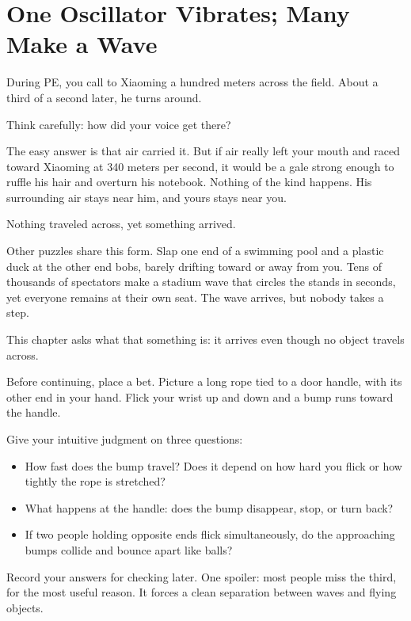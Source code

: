 \chapter{One Oscillator Vibrates; Many Make a Wave}


\begin{mainline}
During PE, you call to Xiaoming a hundred meters across the field. About a third of a second later, he turns around.

Think carefully: how did your voice get there?

The easy answer is that air carried it. But if air really left your mouth and raced toward Xiaoming at 340 meters per second, it would be a gale strong enough to ruffle his hair and overturn his notebook. Nothing of the kind happens. His surrounding air stays near him, and yours stays near you.

Nothing traveled across, yet something arrived.

Other puzzles share this form. Slap one end of a swimming pool and a plastic duck at the other end bobs, barely drifting toward or away from you. Tens of thousands of spectators make a stadium wave that circles the stands in seconds, yet everyone remains at their own seat. The wave arrives, but nobody takes a step.

This chapter asks what that something is: it arrives even though no object travels across.
\end{mainline}


\begin{mainline}
Before continuing, place a bet. Picture a long rope tied to a door handle, with its other end in your hand. Flick your wrist up and down and a bump runs toward the handle.

Give your intuitive judgment on three questions:

\begin{itemize}
  \item How fast does the bump travel? Does it depend on how hard you flick or how tightly the rope is stretched?
  \item What happens at the handle: does the bump disappear, stop, or turn back?
  \item If two people holding opposite ends flick simultaneously, do the approaching bumps collide and bounce apart like balls?
\end{itemize}

Record your answers for checking later. One spoiler: most people miss the third, for the most useful reason. It forces a clean separation between waves and flying objects.
\end{mainline}

